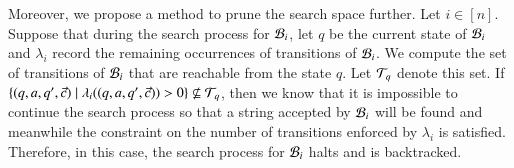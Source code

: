 Moreover, we propose a method to prune the search space further. Let $i \in [n]$. Suppose that during the search process for $\mathcal{B}_i$, let $q$ be the current state of $\mathcal{B}_i$ and $\lambda_i$ record the remaining occurrences of transitions of $\mathcal{B}_i$. We compute the set of transitions of $\mathcal{B}_i$ that are reachable from the state $q$. Let $\mathcal{T}_q$ denote this set. If $\{(q, a, q', \vec{c}) \mid \lambda_i((q, a, q', \vec{c})) > 0\} \not \subseteq \mathcal{T}_q$, then we know that it is impossible to continue the search process so that a string accepted by $\mathcal{B}_i$ will be found and meanwhile the constraint on the number of transitions enforced by $\lambda_i$ is satisfied. Therefore, in this case, the search process for $\mathcal{B}_i$ halts and is backtracked. 


